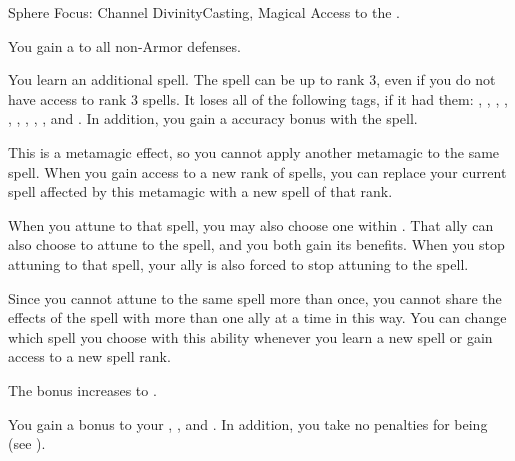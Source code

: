   \begin{magicalfeat}{Sphere Focus: Channel Divinity}{Casting, Magical}
    \featpre Access to the  .

     You gain a   to all non-Armor defenses.

     You learn an additional spell.
    The spell can be up to rank 3, even if you do not have access to rank 3 spells.
    It loses all of the following tags, if it had them: \atAir, \atAuditory, \atCompulsion, \atCold, \atEarth, \atEmotion, \atElectricity, \atFire, \atVisual, and \atWater.
    In addition, you gain a  accuracy bonus with the spell.

    This is a metamagic effect, so you cannot apply another metamagic to the same spell.
    When you gain access to a new rank of spells, you can replace your current spell affected by this metamagic with a new spell of that rank.

    When you attune to that spell, you may also choose one  within \medrange.
    That ally can also choose to attune to the spell, and you both gain its benefits.
    When you stop attuning to that spell, your ally is also forced to stop attuning to the spell.

    Since you cannot attune to the same spell more than once, you cannot share the effects of the spell with more than one ally at a time in this way.
    You can change which spell you choose with this ability whenever you learn a new spell or gain access to a new spell rank.

     The bonus increases to .

     You gain a  bonus to your , , and .
    In addition, you take no penalties for being  (see ).
  \end{magicalfeat}

